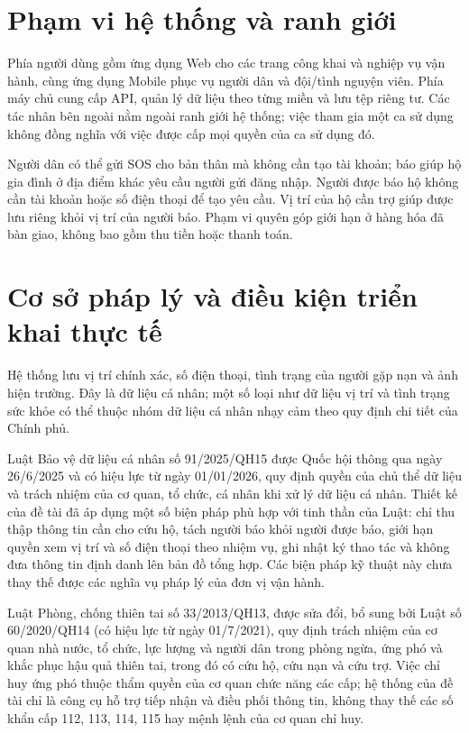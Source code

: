 \documentclass[12pt,a4paper,oneside]{report}
\begin{document}
\section{Phạm vi hệ thống và ranh giới}
Phía người dùng gồm ứng dụng Web cho các trang công khai và nghiệp vụ vận hành, cùng ứng dụng Mobile phục vụ người dân và đội/tình nguyện viên. Phía máy chủ cung cấp API, quản lý dữ liệu theo từng miền và lưu tệp riêng tư. Các tác nhân bên ngoài nằm ngoài ranh giới hệ thống; việc tham gia một ca sử dụng không đồng nghĩa với việc được cấp mọi quyền của ca sử dụng đó.

Người dân có thể gửi SOS cho bản thân mà không cần tạo tài khoản; báo giúp hộ gia đình ở địa điểm khác yêu cầu người gửi đăng nhập. Người được báo hộ không cần tài khoản hoặc số điện thoại để tạo yêu cầu. Vị trí của hộ cần trợ giúp được lưu riêng khỏi vị trí của người báo. Phạm vi quyên góp giới hạn ở hàng hóa đã bàn giao, không bao gồm thu tiền hoặc thanh toán.


\section{Cơ sở pháp lý và điều kiện triển khai thực tế}\label{sec:legal}
Hệ thống lưu vị trí chính xác, số điện thoại, tình trạng của người gặp nạn và ảnh hiện trường. Đây là dữ liệu cá nhân; một số loại như dữ liệu vị trí và tình trạng sức khỏe có thể thuộc nhóm dữ liệu cá nhân nhạy cảm theo quy định chi tiết của Chính phủ.

Luật Bảo vệ dữ liệu cá nhân số 91/2025/QH15 được Quốc hội thông qua ngày 26/6/2025 và có hiệu lực từ ngày 01/01/2026, quy định quyền của chủ thể dữ liệu và trách nhiệm của cơ quan, tổ chức, cá nhân khi xử lý dữ liệu cá nhân. Thiết kế của đề tài đã áp dụng một số biện pháp phù hợp với tinh thần của Luật: chỉ thu thập thông tin cần cho cứu hộ, tách người báo khỏi người được báo, giới hạn quyền xem vị trí và số điện thoại theo nhiệm vụ, ghi nhật ký thao tác và không đưa thông tin định danh lên bản đồ tổng hợp. Các biện pháp kỹ thuật này chưa thay thế được các nghĩa vụ pháp lý của đơn vị vận hành.

Luật Phòng, chống thiên tai số 33/2013/QH13, được sửa đổi, bổ sung bởi Luật số 60/2020/QH14 (có hiệu lực từ ngày 01/7/2021), quy định trách nhiệm của cơ quan nhà nước, tổ chức, lực lượng và người dân trong phòng ngừa, ứng phó và khắc phục hậu quả thiên tai, trong đó có cứu hộ, cứu nạn và cứu trợ. Việc chỉ huy ứng phó thuộc thẩm quyền của cơ quan chức năng các cấp; hệ thống của đề tài chỉ là công cụ hỗ trợ tiếp nhận và điều phối thông tin, không thay thế các số khẩn cấp 112, 113, 114, 115 hay mệnh lệnh của cơ quan chỉ huy.
\end{document}
